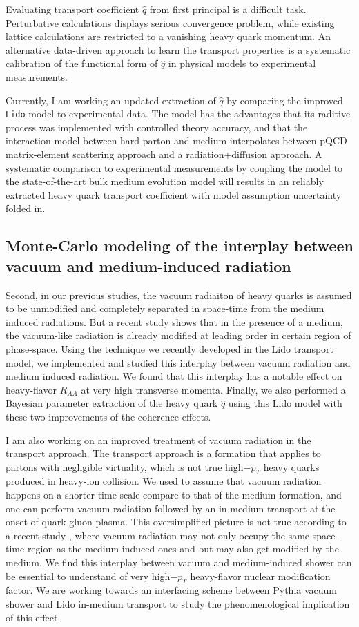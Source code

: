 \documentclass[10pt,a4paper]{article}
\begin{document}
Evaluating transport coefficient $\hat{q}$ from first principal is a difficult task. Perturbative calculations displays serious convergence problem, while existing lattice calculations are restricted to a vanishing heavy quark momentum. An alternative data-driven approach to learn the transport properties is a systematic calibration of the functional form of $\hat{q}$ in physical models to experimental measurements.

Currently, I am working an updated extraction of $\hat{q}$ by comparing the improved {\tt Lido} model to experimental data. 
The model has the advantages that its raditive process was implemented with controlled theory accuracy, and that the interaction model between hard parton and medium interpolates between pQCD matrix-element scattering approach and a radiation+diffusion approach. 
A systematic comparison to experimental measurements by coupling the model to the state-of-the-art bulk medium evolution model will results in an reliably extracted heavy quark transport coefficient with model assumption uncertainty folded in.

\subsection{Monte-Carlo modeling of the interplay between vacuum and medium-induced radiation}

Second, in our previous studies, the vacuum radiaiton of heavy quarks is assumed to be unmodified and completely separated in space-time from the medium induced radiations. But a recent study shows that in the presence of a medium, the vacuum-like radiation is already modified at leading order in certain region of phase-space. Using the technique we recently developed in the Lido transport model, we implemented and studied this interplay between vacuum radiation and medium induced radiation. We found that this interplay has a notable effect on heavy-flavor $R_{AA}$ at very high transverse momenta. Finally, we also performed a Bayesian parameter extraction of the heavy quark $\hat{q}$ using this Lido model with these two improvements of the coherence effects. 

I am also working on an improved treatment of vacuum radiation in the transport approach. The transport approach is a formation that applies to partons with negligible virtuality, which is not true high$-p_T$ heavy quarks produced  in heavy-ion collision. 
We used to assume that vacuum radiation happens on a shorter time scale compare to that of the medium formation, and one can perform vacuum radiation followed by an in-medium transport at the onset of quark-gluon plasma.
This oversimplified picture is not true according to a recent study \cite{Caucal:2018dla}, where vacuum radiation may not only occupy the same space-time region as the medium-induced ones and but may also get modified by the medium.
We find this interplay between vacuum and medium-induced shower can be essential to understand of very high$-p_T$ heavy-flavor nuclear modification factor. 
We are working towards an interfacing scheme between Pythia vacuum shower and Lido in-medium transport to study the phenomenological implication of this effect.
\end{document}
